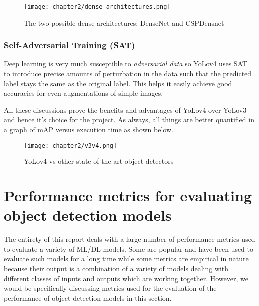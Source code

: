 \begin{figure}[h]
  \centering
    \texttt{[image: chapter2/dense\_architectures.png]}
  \caption{The two possible dense architectures: DenseNet and CSPDensnet}
  \label{fig:dense_arch}
\end{figure}

\subsubsection{Self-Adversarial Training (SAT)}
Deep learning is very much susceptible to \textit{adversarial data} so YoLov4 uses SAT to introduce precise amounts of perturbation in the data such that the predicted label stays the same as the original label. This helps it easily achieve good accuracies for even augmentations of simple images.

All these discussions prove the benefits and advantages of YoLov4 over YoLov3 and hence it's choice for the project. As always, all things are better quantified in a graph of mAP versus execution time as shown below.

\begin{figure}[h]
  \centering
  \texttt{[image: chapter2/v3v4.png]}
  \caption{YoLov4 vs other state of the art object detectors}
  \label{fig:v3_vs_v4}
\end{figure}


\section{Performance metrics for evaluating object detection models \cite{Koech2020}} \label{metrics}

The entirety of this report deals with a large number of performance metrics used to evaluate a variety of ML/DL models. Some are popular and have been used to evaluate such models for a long time while some metrics are empirical in nature because their output is a combination of a variety of models dealing with different classes of inputs and outputs which are working together. However, we would be specifically discussing metrics used for the evaluation of the performance of object detection models in this section.
